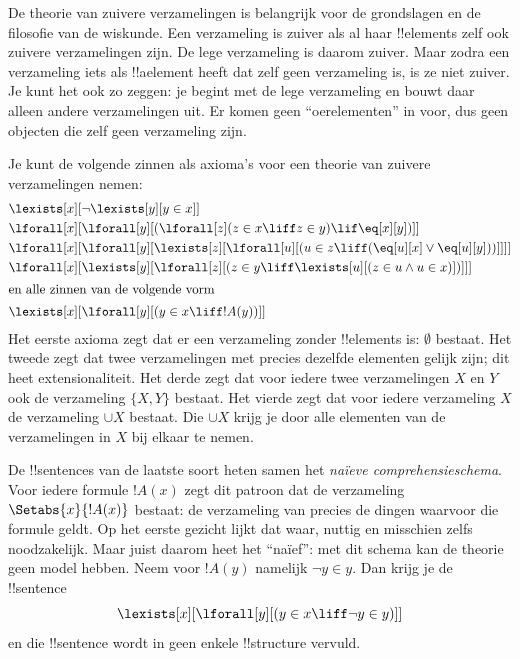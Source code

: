 \documentclass[openany]{memoir}
\begin{document}
\begin{ex}
De theorie van zuivere verzamelingen is belangrijk voor de grondslagen
en de filosofie van de wiskunde. Een verzameling is zuiver als al haar
!!{element}s zelf ook zuivere verzamelingen zijn. De lege verzameling
is daarom zuiver. Maar zodra een verzameling iets als !!a{element}
heeft dat zelf geen verzameling is, is ze niet zuiver. Je kunt het ook
zo zeggen: je begint met de lege verzameling en bouwt daar alleen
andere verzamelingen uit. Er komen geen ``oerelementen'' in voor, dus
geen objecten die zelf geen verzameling zijn.

Je kunt de volgende zinnen als axioma's voor een theorie van zuivere
verzamelingen nemen:
\begin{align*}
& \lexists[x][\lnot \lexists[y][y \in x]]\\
& \lforall[x][\lforall[y][(\lforall[z](z \in x \liff z \in y) \lif 
\eq[x][y])]]\\
& \lforall[x][\lforall[y][\lexists[z][\lforall[u][(u \in z \liff
(\eq[u][x] \lor \eq[u][y]))]]]]\\
& \lforall[x][\lexists[y][\lforall[z][(z \in y \liff \lexists[u][(z \in
        u \land u \in x)])]]]\\
\intertext{en alle zinnen van de volgende vorm} &
\lexists[x][\lforall[y][(y \in x \liff !A(y))]]
\end{align*}
Het eerste axioma zegt dat er een verzameling zonder !!{element}s is:
$\emptyset$ bestaat. Het tweede zegt dat twee verzamelingen met precies
dezelfde elementen gelijk zijn; dit heet extensionaliteit. Het derde
zegt dat voor iedere twee verzamelingen $X$ en $Y$ ook de verzameling
$\{X, Y\}$ bestaat. Het vierde zegt dat voor iedere verzameling $X$ de
verzameling $\cup X$ bestaat. Die $\cup X$ krijg je door alle elementen
van de verzamelingen in $X$ bij elkaar te nemen.

De !!{sentence}s van de laatste soort heten samen het
\emph{naïeve comprehensieschema}. Voor iedere formule $!A(x)$ zegt dit
patroon dat de verzameling $\Setabs{x}{!A(x)}$ bestaat: de verzameling
van precies de dingen waarvoor die formule geldt. Op het eerste gezicht
lijkt dat waar, nuttig en misschien zelfs noodzakelijk. Maar juist
daarom heet het ``naïef'': met dit schema kan de theorie geen model
hebben. Neem voor $!A(y)$ namelijk $\lnot y \in y$. Dan krijg je de
!!{sentence}
\[
\lexists[x][\lforall[y][(y \in x \liff \lnot y \in y)]]
\]
en die !!{sentence} wordt in geen enkele !!{structure} vervuld.
\end{ex}
\end{document}
